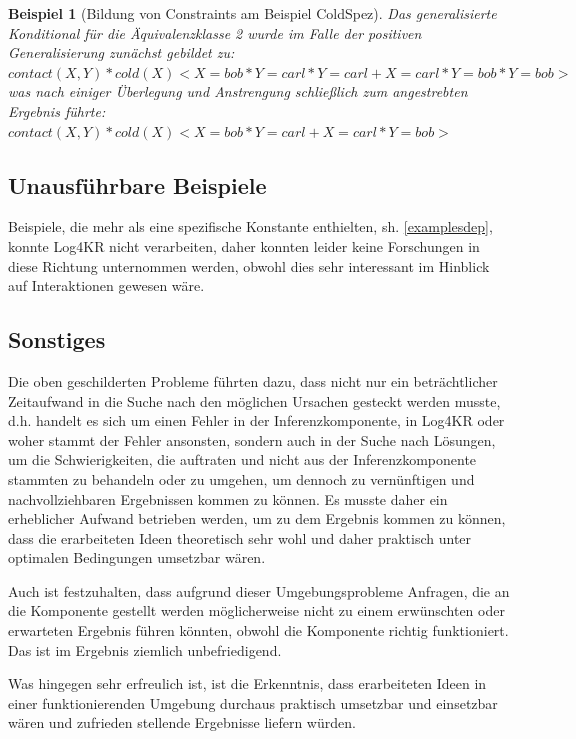 \documentclass[a4paper, 11pt]{book}
\newtheorem{Bsp}{Beispiel}[section]
\begin{document}
{\begin{Bsp}[Bildung von Constraints am Beispiel ColdSpez]
	Das generalisierte Konditional für die Äquivalenzklasse 2 wurde im Falle der positiven Generalisierung zunächst gebildet zu:\\
	$ contact(X,Y) * cold(X) <X=bob * Y=carl * Y=carl + X=carl * Y=bob * Y=bob>$\\
	was nach einiger Überlegung und Anstrengung schließlich zum angestrebten Ergebnis führte:\\
	$ contact(X,Y) * cold(X) <X=bob * Y=carl + X=carl * Y=bob >$\\
	
\end{Bsp}



\subsection{Unausführbare Beispiele} \label{Beispiele unausfuehrbar} 
Beispiele, die mehr als eine spezifische Konstante enthielten, sh. \ref{examplesdep}, konnte Log4KR nicht verarbeiten, daher konnten leider keine Forschungen in diese Richtung unternommen werden, obwohl dies sehr interessant im Hinblick auf Interaktionen gewesen wäre. 

\subsection{Sonstiges}
Die oben geschilderten Probleme führten dazu, dass nicht nur ein beträchtlicher Zeitaufwand in die Suche nach den möglichen Ursachen gesteckt werden musste, d.h. handelt es sich um einen Fehler in der Inferenzkomponente, in Log4KR oder woher stammt der Fehler ansonsten, sondern auch in der Suche nach Lösungen, um die Schwierigkeiten, die auftraten und nicht aus der Inferenzkomponente stammten zu behandeln oder zu umgehen, um dennoch zu vernünftigen und nachvollziehbaren Ergebnissen kommen zu können. 
Es musste daher ein erheblicher Aufwand betrieben werden, um zu dem Ergebnis kommen zu können, dass die erarbeiteten Ideen theoretisch sehr wohl und daher praktisch unter optimalen Bedingungen umsetzbar wären.

Auch ist festzuhalten, dass aufgrund dieser Umgebungsprobleme Anfragen, die an die Komponente gestellt werden möglicherweise nicht zu einem erwünschten oder erwarteten Ergebnis führen könnten, obwohl die Komponente richtig funktioniert. Das ist im Ergebnis ziemlich unbefriedigend. 

Was hingegen sehr erfreulich ist, ist die Erkenntnis, dass erarbeiteten Ideen in einer funktionierenden Umgebung durchaus praktisch umsetzbar und einsetzbar wären und zufrieden stellende Ergebnisse liefern würden.

}
\end{document}
